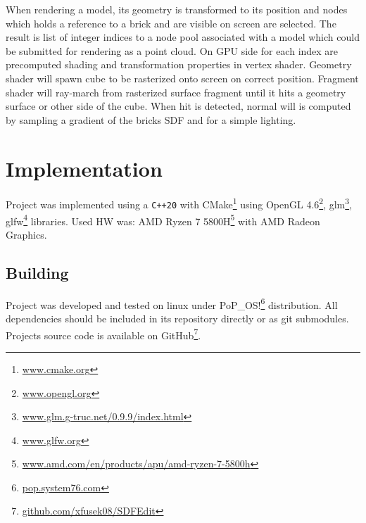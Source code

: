 \documentclass[11pt, a4paper]{article}
\begin{document}
When rendering a model, its geometry is transformed to its position and nodes which holds a reference to a brick and are visible on screen are selected.
The result is list of integer indices to a node pool associated with a model which could be submitted for rendering as a point cloud.
On GPU side for each index are precomputed shading and transformation properties in vertex shader.
Geometry shader will spawn cube to be rasterized onto screen on correct position.
Fragment shader will ray-march from rasterized surface fragment until it hits a geometry surface or other side of the cube.
When hit is detected, normal will is computed by sampling a gradient of the bricks SDF and for a simple lighting.


\section{Implementation}

Project was implemented using a \texttt{C++20} with CMake\footnote{\href{https://cmake.org/}{www.cmake.org}} using OpenGL 4.6\footnote{\href{https://www.opengl.org/}{www.opengl.org}}, glm\footnote{\href{https://glm.g-truc.net/0.9.9/index.html}{www.glm.g-truc.net/0.9.9/index.html}}, glfw\footnote{\href{https://www.glfw.org/}{www.glfw.org}} libraries.
Used HW was: AMD Ryzen{\scriptsize\texttrademark} 7 5800H\footnote{\href{https://www.amd.com/en/products/apu/amd-ryzen-7-5800h}{www.amd.com/en/products/apu/amd-ryzen-7-5800h}}
with AMD Radeon{\scriptsize\texttrademark} Graphics.
\subsection{Building}
Project was developed and tested on linux under PoP\_OS!\footnote{\href{https://pop.system76.com/}{pop.system76.com}} distribution.
All dependencies should be included in its repository directly or as git submodules.
Projects source code is available on GitHub\footnote{\href{https://github.com/xfusek08/SDFEdit}{github.com/xfusek08/SDFEdit}}.
\end{document}
